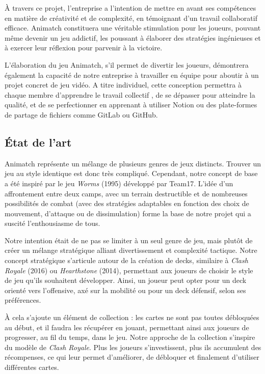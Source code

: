\documentclass[12pt,a4paper]{article}
\begin{document}
À travers ce projet, l'entreprise a l'intention de mettre en avant ses compétences en matière de créativité et de complexité, en témoignant d'un travail collaboratif efficace. Animatch constituera une véritable stimulation pour les joueurs, pouvant même devenir un jeu addictif, les poussant à élaborer des stratégies ingénieuses et à exercer leur réflexion pour parvenir à la victoire. 

L'élaboration du jeu Animatch, s'il permet de divertir les joueurs, démontrera également la capacité de notre entreprise à travailler en équipe pour aboutir à un projet concret de jeu vidéo. A titre individuel, cette conception permettra à chaque membre d'apprendre le travail collectif , de se dépasser pour atteindre la qualité, et de se perfectionner en apprenant à utiliser Notion ou des plate-formes de partage de fichiers comme GitLab ou GitHub.
\clearpage

\subsection{État de l'art}
Animatch représente un mélange de plusieurs genres de jeux distincts. Trouver un jeu au style identique est donc très compliqué. Cependant, notre concept de base a été inspiré par le jeu \textit{Worms} (1995) développé par Team17. L'idée d'un affrontement entre deux camps, avec un terrain destructible et de nombreuses possibilités de combat (avec des stratégies adaptables en fonction des choix de mouvement, d'attaque ou de dissimulation) forme la base de notre projet qui a suscité l'enthousiasme de tous.

Notre intention était de ne pas se limiter à un seul genre de jeu, mais plutôt de créer un mélange stratégique alliant divertissement et complexité tactique. Notre concept stratégique s'articule autour de la création de decks, similaire à \textit{Clash Royale} (2016) ou \textit{Hearthstone} (2014), permettant aux joueurs de choisir le style de jeu qu'ils souhaitent développer. Ainsi, un joueur peut opter pour un deck orienté vers l'offensive, axé sur la mobilité ou pour un deck défensif, selon ses préférences.

À cela s'ajoute un élément de collection : les cartes ne sont pas toutes débloquées au début, et il faudra les récupérer en jouant, permettant ainsi aux joueurs de progresser, au fil du temps, dans le jeu. Notre approche de la collection s'inspire du modèle de \textit{Clash Royale}. Plus les joueurs s'investissent, plus ils accumulent des récompenses, ce qui leur permet d'améliorer, de débloquer et finalement d'utiliser différentes cartes.
\end{document}
